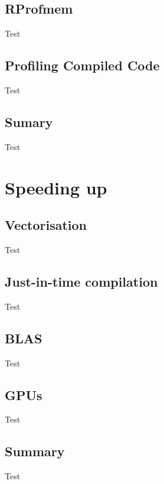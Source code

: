 \documentclass[compress]{beamer}
\begin{document}
\subsection{RProfmem}
\begin{frame}Test\end{frame}
\subsection[Profiling]{Profiling Compiled Code}
\begin{frame}Test\end{frame}
\subsection{Sumary}
\begin{frame}Test\end{frame}

\section[Faster]{Speeding up}
\subsection[Vec]{Vectorisation}
\begin{frame}Test\end{frame}
\subsection[Ra]{Just-in-time compilation}
\begin{frame}Test\end{frame}
\subsection{BLAS}
\begin{frame}Test\end{frame}
\subsection{GPUs}
\begin{frame}Test\end{frame}
\subsection{Summary}
\begin{frame}Test\end{frame}
\end{document}
